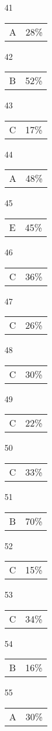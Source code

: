 \documentclass[12pt]{article}
\begin{document}
\begin{multicols}{5}
\begin{enumerate}
\item[41] \begin{tabular}{cc} A & 28\%\end{tabular}
\item[42] \begin{tabular}{cc} B & 52\%\end{tabular}
\item[43] \begin{tabular}{cc} C & 17\%\end{tabular}
\item[44] \begin{tabular}{cc} A & 48\%\end{tabular}
\item[45] \begin{tabular}{cc} E & 45\%\end{tabular}
\item[]
\item[46] \begin{tabular}{cc} C & 36\%\end{tabular}
\item[47] \begin{tabular}{cc} C & 26\%\end{tabular}
\item[48] \begin{tabular}{cc} C & 30\%\end{tabular}
\item[49] \begin{tabular}{cc} C & 22\%\end{tabular}
\item[50] \begin{tabular}{cc} C & 33\%\end{tabular}
\item[]
\item[51] \begin{tabular}{cc} B & 70\%\end{tabular}
\item[52] \begin{tabular}{cc} C & 15\%\end{tabular}
\item[53] \begin{tabular}{cc} C & 34\%\end{tabular}
\item[54] \begin{tabular}{cc} B & 16\%\end{tabular}
\item[55] \begin{tabular}{cc} A & 30\%\end{tabular}

\end{enumerate}
\end{multicols}
\end{document}
